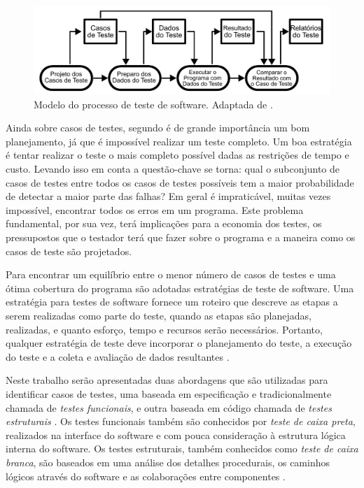 \begin{figure}[ht]
\centering
\includegraphics[scale=0.7]{imagens/processo_teste.pdf}
\caption{Modelo do processo de teste de software. Adaptada de \cite{sommerville2010}.}
\label{fig:processo_teste}
\end{figure}

Ainda sobre casos de testes, segundo \cite{myers2011art} é de grande importância um bom planejamento, já que é impossível realizar um teste completo. Um boa estratégia é tentar realizar o teste o mais completo possível dadas as restrições de tempo e custo. Levando isso em conta a questão-chave se torna: qual o subconjunto de casos de testes entre todos os casos de testes possíveis tem a maior probabilidade de detectar a maior parte das falhas? Em geral é impraticável, muitas vezes impossível, encontrar todos os erros em um programa. Este problema fundamental, por sua vez, terá implicações para a economia dos testes, os pressupostos que o testador terá que fazer sobre o programa e a maneira como os casos de teste são projetados.

Para encontrar um equilíbrio entre o menor número de casos de testes e uma ótima cobertura do programa são adotadas estratégias de teste de software. Uma estratégia para testes de software fornece um roteiro que descreve as etapas a serem realizadas como parte do teste, quando as etapas são planejadas, realizadas, e quanto esforço, tempo e recursos serão necessários. Portanto, qualquer estratégia de teste deve incorporar o planejamento do teste, a execução do teste e a coleta e avaliação de dados resultantes \cite{pressman2005software}.

Neste trabalho serão apresentadas duas abordagens que são utilizadas para identificar casos de testes, uma  baseada em especificação e tradicionalmente chamada de \textit{testes funcionais}, e outra baseada em código chamada de\textit{ testes estruturais} \cite{jorgensen2016software}. Os testes funcionais também são conhecidos por \textit{teste de caixa preta}, realizados na interface do software e com pouca consideração à estrutura lógica interna do software. Os testes estruturais, também conhecidos como \textit{teste de caixa branca}, são baseados em uma análise dos detalhes procedurais, os caminhos lógicos através do software e as colaborações entre componentes \cite{pressman2005software}.

